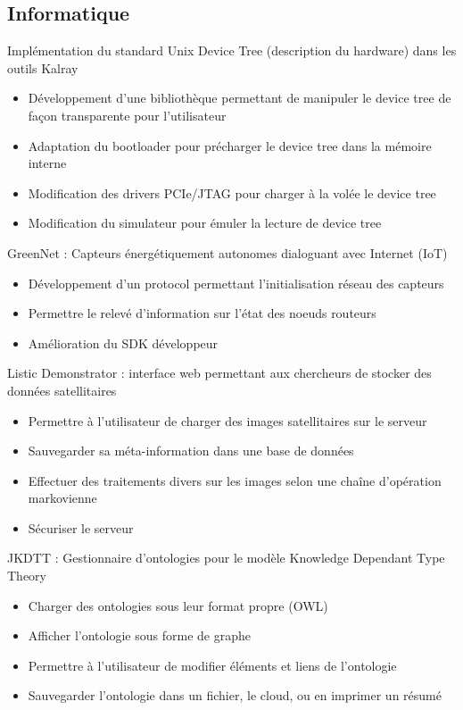 \documentclass[10pt,a4paper,sans]{moderncv}        %
\begin{document}
\subsection{Informatique}
 	{Implémentation du standard Unix Device Tree (description du hardware) dans les outils Kalray
 	\begin{itemize}
 		\item Développement d'une bibliothèque permettant de manipuler le device
 			tree de façon transparente pour l'utilisateur
 		\item Adaptation du bootloader pour précharger le device tree dans la
 			mémoire interne
 		\item Modification des drivers PCIe/JTAG pour charger à la volée le
 			device tree
 		\item Modification du simulateur pour émuler la lecture de device tree
 	\end{itemize}
 	}
	{GreenNet : Capteurs énergétiquement autonomes dialoguant avec Internet
		(IoT)
	\begin{itemize}
		\item Développement d'un protocol permettant l'initialisation réseau des
			capteurs
		\item Permettre le relevé d'information sur l'état des noeuds routeurs
		\item Amélioration du SDK développeur
	\end{itemize}
	}
	{Listic Demonstrator : interface web permettant aux chercheurs de stocker des
	données satellitaires
	\begin{itemize}
		\item Permettre à l'utilisateur de charger des images satellitaires sur
			le serveur
		\item Sauvegarder sa méta-information dans une base de données
		\item Effectuer des traitements divers sur les images selon une chaîne
			d'opération markovienne
		\item Sécuriser le serveur
	\end{itemize}
	}
	{JKDTT : Gestionnaire d'ontologies pour le modèle Knowledge Dependant Type
		Theory
	\begin{itemize}
		\item Charger des ontologies sous leur format propre (OWL)
		\item Afficher l'ontologie sous forme de graphe
		\item Permettre à l'utilisateur de modifier éléments et liens de
			l'ontologie
		\item Sauvegarder l'ontologie dans un fichier, le cloud, ou en imprimer
			un résumé
	\end{itemize}
	}
\end{document}
